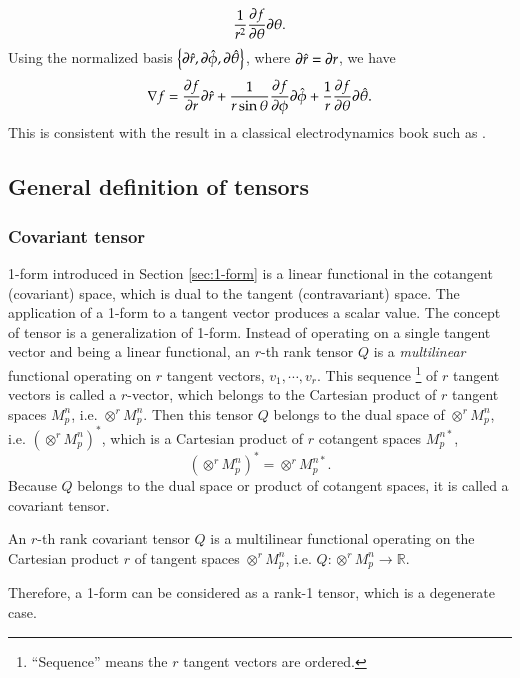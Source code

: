\documentclass[11pt, a4paper]{book}
\begin{document}
\begin{Example}
\begin{equation}
    \frac{1}{r^2} \frac{\partial f}{\partial \theta} \boldsymbol{\partial}\theta.
  \end{equation}
  Using the normalized basis
  $\left\{ \boldsymbol{\partial}\hat{r}, \boldsymbol{\partial}\hat{\phi}, \boldsymbol{\partial}\hat{\theta}
  \right\}$, where $\boldsymbol{\partial}\hat{r} = \boldsymbol{\partial}r$, we have
  \begin{equation}
    \nabla f = \frac{\partial f}{\partial r}\boldsymbol{\partial}\hat{r} + \frac{1}{r\sin\theta} \frac{\partial f}{\partial \phi} \boldsymbol{\partial}\hat{\phi} +
    \frac{1}{r} \frac{\partial f}{\partial \theta} \boldsymbol{\partial}\hat{\theta}.
  \end{equation}
  This is consistent with the result in a classical electrodynamics book such as
  \citep{GriffithsIntroduction1999}.
\end{Example}

\subsection{General definition of tensors}

\subsubsection{Covariant tensor}

1-form introduced in Section \ref{sec:1-form} is a linear functional in the cotangent
(covariant) space, which is dual to the tangent (contravariant) space. The application of
a 1-form to a tangent vector produces a scalar value. The concept of tensor is a
generalization of 1-form. Instead of operating on a single tangent vector and being a
linear functional, an $r$-th rank tensor $Q$ is a \emph{multilinear} functional operating
on $r$ tangent vectors, $v_1, \cdots, v_r$. This sequence \footnote{``Sequence'' means the
  $r$ tangent vectors are ordered.} of $r$ tangent vectors is called a $r$-vector, which
belongs to the Cartesian product of $r$ tangent spaces $M_p^n$, i.e. $\otimes^r M_p^n$.
Then this tensor $Q$ belongs to the dual space of $\otimes^r M_p^n$, i.e.
$\left( \otimes^r M_p^n \right)^*$, which is a Cartesian product of $r$ cotangent spaces
$M_p^{n*}$,
\begin{equation}
  \left( \otimes^r M_p^n \right)^* = \otimes^r M_p^{n*}.
\end{equation}
Because $Q$ belongs to the dual space or product of cotangent spaces, it is called a
covariant tensor.

\begin{Definition}
  An $r$-th rank covariant tensor $Q$ is a multilinear functional operating on the
  Cartesian product $r$ of tangent spaces $\otimes^r M_p^n$, i.e.
  $Q: \otimes^r M_p^n \rightarrow \mathbb{R}$.
\end{Definition}
Therefore, a 1-form can be considered as a rank-1 tensor, which is a degenerate case.
\end{document}
